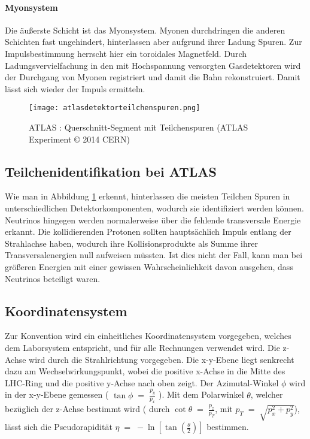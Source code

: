\documentclass[
a4paper,                                %
twoside,                                %
BCOR1.4cm,                      %
ngerman,                                %
10pt,                           %
headings=normal,                %
headsepline,                    %
clearplainpage, %
final,                                  %
div=14,
parskip=full
]{scrbook}
\begin{document}
\paragraph*{Myonsystem}

Die \"au\ss erste Schicht ist das Myonsystem. Myonen durchdringen die anderen Schichten fast ungehindert, hinterlassen aber aufgrund ihrer Ladung Spuren. Zur Impulsbestimmung herrscht hier ein toroidales Magnetfeld. Durch Ladungsvervielfachung in den mit Hochspannung versorgten Gasdetektoren wird der Durchgang von Myonen registriert und damit die Bahn rekonstruiert. Damit l\"asst sich wieder der Impuls ermitteln.
\\
\begin{figure}[h]
	\texttt{[image: atlasdetektorteilchenspuren.png]}
	\caption{ATLAS : Querschnitt-Segment mit Teilchenspuren (ATLAS Experiment © 2014 CERN)}
	\label{spuren}
\end{figure}

\subsection{Teilchenidentifikation bei ATLAS}

Wie man in Abbildung \ref{spuren} erkennt, hinterlassen die meisten Teilchen Spuren in unterschiedlichen Detektorkomponenten, wodurch sie identifiziert werden k\"onnen. Neutrinos hingegen werden normalerweise \"uber die fehlende transversale Energie erkannt. Die kollidierenden Protonen sollten haupts\"achlich Impuls entlang der Strahlachse haben, wodurch ihre Kollisionsprodukte als Summe ihrer Transversalenergien null aufweisen m\"ussten. Ist dies nicht der Fall, kann man bei gr\"o\ss eren Energien mit einer gewissen Wahrscheinlichkeit davon ausgehen, dass Neutrinos beteiligt waren. \cite{atlastdr}

\subsection{Koordinatensystem}

Zur Konvention wird ein einheitliches Koordinatensystem vorgegeben, welches dem Laborsystem entspricht, und f\"ur alle Rechnungen verwendet wird. Die z-Achse wird durch die Strahlrichtung vorgegeben. Die x-y-Ebene liegt senkrecht dazu am Wechselwirkungspunkt, wobei die positive x-Achse in die Mitte des LHC-Ring und die positive y-Achse nach oben zeigt. Der Azimutal-Winkel $ \phi $ wird in der x-y-Ebene gemessen ( $ \tan\phi\;=\;\tfrac{p_{y}}{p_{x}} $ ). Mit dem Polarwinkel $ \theta $, welcher bez\"uglich der z-Achse bestimmt wird ( durch 
$ \cot\theta\;=\;\tfrac{p_{z}}{p_{T}} $, mit $\textstyle p_{T}\;=\;\sqrt{p_{x}^{2} + p_{y}^{2}} $), l\"asst sich die Pseudorapidit\"at $\textstyle \eta\;=\;-\ln\left[\tan\left(\tfrac{\theta}{2}\right)\right] $ bestimmen. \cite{atlastdr}
\end{document}
